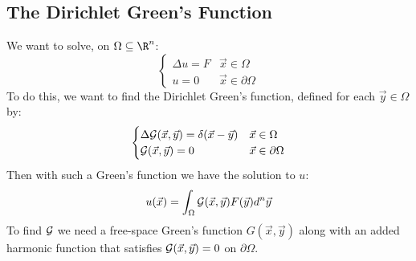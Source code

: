\documentclass[../Main.tex]{subfiles}
\begin{document}
\subsection{The Dirichlet Green's Function}
We want to solve, on $\Omega \subseteq \R^n$:
\begin{equation}
    \begin{cases}
        \Delta u = F & \vec{x} \in \Omega \\
        u = 0 & \vec{x} \in \partial \Omega
    \end{cases}
    \label{eqnLaplacianForcedUnbdd}
\end{equation}
To do this, we want to find the Dirichlet Green's function, defined for each $\vec{y} \in \Omega$ by:
\begin{equation*}
    \begin{cases}
        \Delta \mathcal{G}(\vec{x}, \vec{y}) = \delta(\vec{x} - \vec{y}) & \vec{x} \in \Omega \\
        \mathcal{G}(\vec{x}, \vec{y}) = 0 & \vec{x} \in \partial \Omega
    \end{cases}
\end{equation*}
Then with such a Green's function we have the solution to $u$:
\begin{equation*}
    u(\vec{x}) = \int_{\Omega} \mathcal{G}(\vec{x}, \vec{y}) F(\vec{y}) d^n \vec{y}
\end{equation*}
To find $\mathcal{G}$ we need a free-space Green's function $G(\vec{x}, \vec{y})$ along with an added harmonic function that satisfies $\mathcal{G}(\vec{x}, \vec{y}) = 0$ on $\partial \Omega$.
\end{document}
